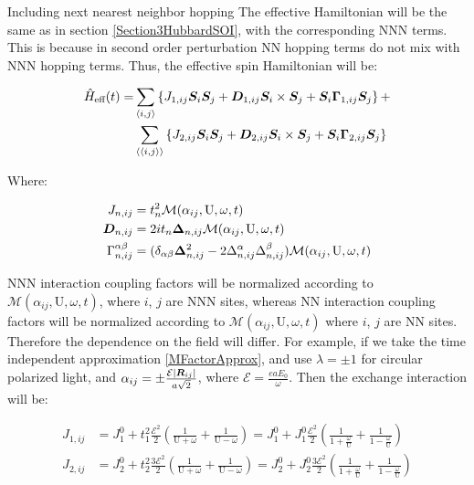 \begin{section}{Including next nearest neighbor hopping}
The effective Hamiltonian will be the same as in section \ref{Section3HubbardSOI}, with the corresponding NNN terms. This is because in second order perturbation NN hopping terms do not mix with NNN hopping terms. Thus, the effective spin Hamiltonian will be:

\begin{align}
\hat{H}_{\text{eff}}(t) = &\sum_{\langle i,j \rangle} \left\{ J_{1,ij}\boldsymbol{S}_i\boldsymbol{S}_j + \boldsymbol{D}_{1,ij} \boldsymbol{S}_i \times \boldsymbol{S}_j + \boldsymbol{S}_i\boldsymbol{\Gamma}_{1,ij}\boldsymbol{S}_j\right\} + \nonumber \\
&\sum_{\langle \langle i,j \rangle \rangle} \left\{ J_{2,ij}\boldsymbol{S}_i\boldsymbol{S}_j + \boldsymbol{D}_{2,ij} \boldsymbol{S}_i \times \boldsymbol{S}_j + \boldsymbol{S}_i\boldsymbol{\Gamma}_{2,ij}\boldsymbol{S}_j\right\}
\end{align}

Where:

\begin{align}
J_{n,ij} &= t_n^2\mathcal{M}(\alpha_{ij}, \text{U}, \omega, t) \label{JGeneral} \\
\boldsymbol{D}_{n,ij} &= 2it_n \boldsymbol{\Delta}_{n,ij}\mathcal{M}(\alpha_{ij}, \text{U}, \omega, t) \label{DGeneral} \\
\Gamma_{n,ij}^{\alpha \beta} &= (\delta_{\alpha \beta} \boldsymbol{\Delta}_{n,ij}^2 - 2\Delta_{n,ij}^\alpha\Delta_{n,ij}^\beta )\mathcal{M}(\alpha_{ij}, \text{U}, \omega, t) \label{GammaGeneral}
\end{align}

NNN interaction coupling factors will be normalized according to $\mathcal{M}(\alpha_{ij}, \text{U}, \omega, t)$, where $i$, $j$ are NNN sites, whereas NN interaction coupling factors will be normalized according to $\mathcal{M}(\alpha_{ij}, \text{U}, \omega, t)$ where $i$, $j$ are NN sites. Therefore the dependence on the field will differ. For example, if we take the time independent approximation \ref{MFactorApprox}, and use $\lambda = \pm 1$ for circular polarized light, and $\alpha_{ij} = \pm\frac{\mathcal{E}|\boldsymbol{R}_{ij}|}{a\sqrt{2}}$, where $\mathcal{E} = \frac{eaE_0}{\omega}$. Then the exchange interaction will be:

\begin{align*}
J_{1,ij} &= J_1^0 + t_1^2 \frac{\mathcal{E}^2}{2} \left( \frac{1}{\text{U}+\omega} + \frac{1}{\text{U}-\omega} \right) = J_1^0 + J_1^0 \frac{\mathcal{E}^2}{2} \left( \frac{1}{1+\frac{\omega}{\text{U}}} + \frac{1}{1-\frac{\omega}{\text{U}}} \right) \\
J_{2,ij} &= J_2^0 + t_2^2 \frac{3\mathcal{E}^2}{2} \left( \frac{1}{\text{U}+\omega} + \frac{1}{\text{U}-\omega} \right) = J_2^0 + J_2^0 \frac{3\mathcal{E}^2}{2} \left( \frac{1}{1+\frac{\omega}{\text{U}}} + \frac{1}{1-\frac{\omega}{\text{U}}} \right) \\
\end{align*}


\end{section}
